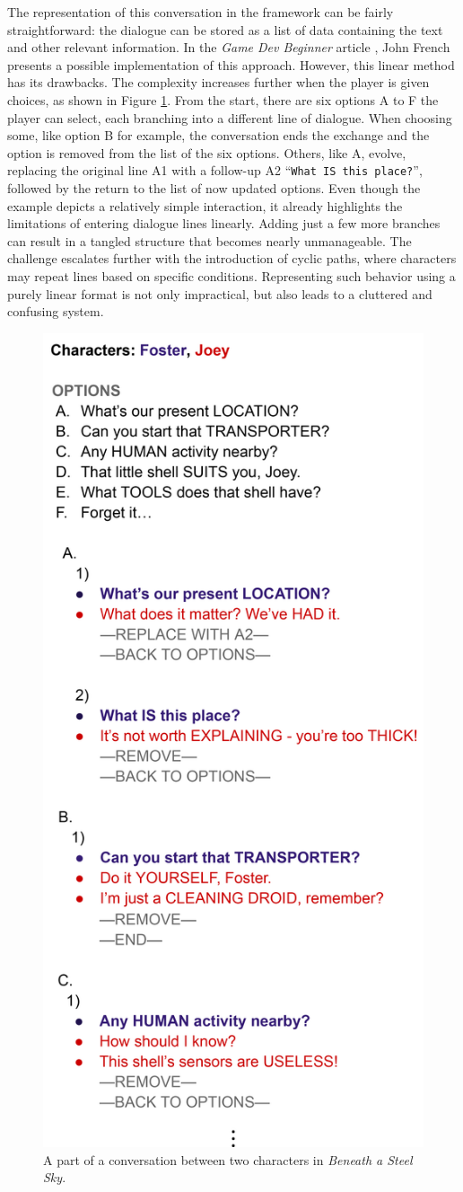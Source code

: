 The representation of this conversation in the framework can be fairly straightforward: the dialogue can be stored as a list of data containing the text and other relevant information. In the \textit{Game Dev Beginner} article \cite{Dialogue-French}, John French presents a possible implementation of this approach. However, this linear method has its drawbacks. The complexity increases further when the player is given choices, as shown in Figure \ref{fig:DialogueChoices}. From the start, there are six options A to F the player can select, each branching into a different line of dialogue. When choosing some, like option B for example, the conversation ends the exchange and the option is removed from the list of the six options.  Others, like A, evolve, replacing the original line A1 with a follow-up A2 “\texttt{What IS this place?}”, followed by the return to the list of now updated options. Even though the example depicts a relatively simple interaction, it already highlights the limitations of entering dialogue lines linearly. Adding just a few more branches can result in a tangled structure that becomes nearly unmanageable. The challenge escalates further with the introduction of cyclic paths, where characters may repeat lines based on specific conditions. Representing such behavior using a purely linear format is not only impractical, but also leads to a cluttered and confusing system.

\begin{figure}[H]
\centering
\includegraphics[width=.5\linewidth]{img/DialogueBig3.png}
\caption{A part of a conversation between two characters in \textit{Beneath a Steel Sky}.}
\label{fig:DialogueChoices}
\end{figure}


